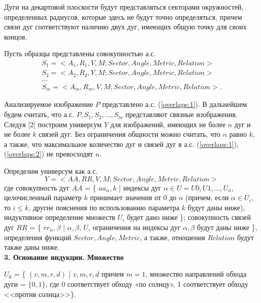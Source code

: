 \begin{remark}
Дуги на декартовой плоскости будут представляться секторами окружностей, определенных радиусов, которые здесь не будут точно определяться, причем связи дуг соответствуют наличию двух дуг, имеющих общую точку для своих концов.  
\end{remark}
Пусть образцы представлены совокупностью   а.с. 
\begin{equation}
\begin{array}{c}
S_1 = < A_1, R_1, V, M; Sector,Angle,Metric,Relation > \\
S_2 = < A_2, R_2, V, M; Sector,Angle,Metric,Relation >  \\                                        
\dots \\
S_m = < A_m, R_m, V, M; Sector,Angle,Metric,Relation >.
\end{array}
\label{overlaps:2}
\end{equation}

Анализируемое изображение $P$ представлено  а.с.  (\ref{overlaps:1}). В дальнейшем будем считать, что а.с. $P, S_1, S_2, . . ., S_m$  представляют связные изображения. 
Следуя [2] построим универсум $Y$ для изображений, имеющих не более $n$ дуг и не более $k$ связей дуг. Без ограничения общности можно считать, что $n$ равно $k$, а также, что максимальное количество дуг и связей дуг в  а.с. (\ref{overlaps:1}), (\ref{overlaps:2})  не превосходят  $n$.    

Определим универсум как  а.с.  
\begin{equation}
Y = < AA, RR, V, M; Sector,  Angle, Metric, Relation >
\label{overlaps:3}
\end{equation}
\noindent
где  совокупность дуг $AA$ = \{ $aa_\alpha,k$ | индексы дуг $\alpha \in U = U0, U1, ..., U_n$,  целочисленный параметр  $k$  принимает значения от  0  до $n$ (причем,  если  $\alpha \in  U_i$,  то $i \leq k$, другие  пояснения по использованию параметра  $k$  будут даны ниже),  индуктивное определение множеств  $U_i$  будет дано ниже \};
совокупность связей дуг $RR$ = \{ $rr_\alpha, \beta$ | $\alpha, \beta$, $U$, ограничения на индексы дуг $\alpha, \beta$  будут даны ниже \}, 
определения функций  $Sector,  Angle, Metric$, а также, отношения $Relation$  будут также даны ниже.      \\

\noindent
\textbf{3. Основание индукции.  Множество  }

$U_0$  = \{ $(v, m, r, d)$ | $v , m , r , d$  причем  $m = 1$, множество направлений  обхода дуги   =  $\{0, 1\}$, где  0  соответствует обходу «по солнцу»,  1 соответствует обходу <<против солнца>>\}. 

